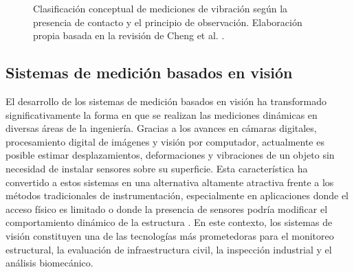\begin{figure}[htbp]
\centering
{}
\caption[Clasificación de mediciones de vibración]{Clasificación conceptual de mediciones de vibración según la presencia de contacto y el principio de observación. Elaboración propia basada en la revisión de Cheng et al. \cite{cheng2025vision}.}
\label{fig:medicion_sin_contacto}
\end{figure}

\subsection{Sistemas de medición basados en visión}

El desarrollo de los sistemas de medición basados en visión ha transformado significativamente la forma en que se realizan las mediciones dinámicas en diversas áreas de la ingeniería. Gracias a los avances en cámaras digitales, procesamiento digital de imágenes y visión por computador, actualmente es posible estimar desplazamientos, deformaciones y vibraciones de un objeto sin necesidad de instalar sensores sobre su superficie. Esta característica ha convertido a estos sistemas en una alternativa altamente atractiva frente a los métodos tradicionales de instrumentación, especialmente en aplicaciones donde el acceso físico es limitado o donde la presencia de sensores podría modificar el comportamiento dinámico de la estructura \cite{cheng2025vision}. En este contexto, los sistemas de visión constituyen una de las tecnologías más prometedoras para el monitoreo estructural, la evaluación de infraestructura civil, la inspección industrial y el análisis biomecánico.


